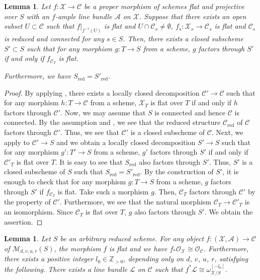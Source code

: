 \documentclass[12pt,twoside]{amsart}
\newtheorem{lem}[thm]{Lemma}
\theoremstyle{definition}
\begin{document}
\begin{lem}\label{lem--flat--moduli}
    Let $f\colon \mathcal{X}\to \mathcal{C}$ be a proper morphism of schemes flat and projective over $S$ with an $f$-ample line bundle $\mathscr{A}$ on $\mathcal{X}$.
    Suppose that there exists an open subset $U\subset \mathcal{C}$ such that $f|_{f^{-1}(U)}$ is flat and $U\cap \mathcal{C}_s\ne\emptyset$, $f_{s}\colon \mathcal{X}_s\to \mathcal{C}_s$ is flat and $\mathcal{C}_s$ is reduced and connected for any $s\in S$.
Then, there exists a closed subscheme $S'\subset S$ such that for any morphism $g\colon T\to S$ from a scheme, $g$ factors through $S'$ if and only if $f_{\mathcal{C}_T}$ is flat.

Furthermore, we have $S_{\mathrm{red}}=S'_{\mathrm{red}}$.
\end{lem}

\begin{proof}
By applying \cite[Theorem 5.13]{FGA}, there exists a locally closed decomposition $\mathcal{C}'\to \mathcal{C}$ such that for any morphism $h\colon T\to \mathcal{C}$ from a scheme, $\mathcal{X}_T$ is flat over $T$ if and only if $h$ factors through $\mathcal{C}'$. 
Now, we may assume that $S$ is connected and hence $\mathcal{C}$ is connected.
By the assumption and \cite[Theorem 3.20]{kollar-moduli}, we see that the reduced structure $\mathcal{C}_{\mathrm{red}}$ of $\mathcal{C}$ factors through $\mathcal{C}'$.
Thus, we see that $\mathcal{C}'$ is a closed subscheme of $\mathcal{C}$.
Next, we apply \cite[Theorem 5.13]{FGA} to $\mathcal{C}'\to S$ and we obtain a locally closed decomposition $S'\to S$ such that for any morphism $g'\colon T'\to S$ from a scheme, $g'$ factors through $S'$ if and only if $\mathcal{C}'_T$ is flat over $T$.
It is easy to see that $S_{\mathrm{red}}$ also factors through $S'$.
Thus, $S'$ is a closed subscheme of $S$ such that $S_{\mathrm{red}}=S'_{\mathrm{red}}$.
By the construction of $S'$, it is enough to check that for any morphism $g\colon T\to S$ from a scheme, $g$ factors through $S'$ if  $f_{\mathcal{C}_T}$ is flat. 
Take such a morphism $g$. 
Then, $\mathcal{C}_{T}$ factors through $\mathcal{C}'$ by the property of $\mathcal{C}'$.
Furthermore, we see that the natural morphism $\mathcal{C}_T\to \mathcal{C}'_T$ is an isomorphism.
Since $\mathcal{C}_T$ is flat over $T$, $g$ also factors through $S'$.
We obtain the assertion. 
\end{proof}


\begin{lem}\label{lem--stein--factorizaton}
Let $S$ be an arbitrary reduced scheme.
    For any object $f\colon (\mathcal{X},\mathscr{A})\to\mathcal{C}$ of $\mathcal{M}_{d,v,u,r}(S)$, the morphism $f$ is flat and we have $f_*\mathcal{O}_{\mathcal{X}}\cong\mathcal{O}_{\mathcal{C}}$.
    Furthermore, there exists a positive integer $l_0\in\mathbb{Z}_{>0}$, depending only on $d$, $v$, $u$, $r$, satisfying the following.
     There exists a line bundle $\mathscr{L}$ on $\mathcal{C}$ such that $f^*\mathscr{L}\cong \omega_{\mathcal{X}/S}^{[-l_0]}$.
  \end{lem}
  
\end{document}
